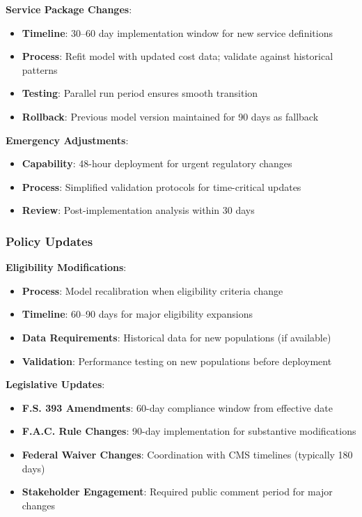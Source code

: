 \textbf{Service Package Changes}:
\begin{itemize}
    \item \textbf{Timeline}: 30--60 day implementation window for new service definitions
    \item \textbf{Process}: Refit model with updated cost data; validate against historical patterns
    \item \textbf{Testing}: Parallel run period ensures smooth transition
    \item \textbf{Rollback}: Previous model version maintained for 90 days as fallback
\end{itemize}

\textbf{Emergency Adjustments}:
\begin{itemize}
    \item \textbf{Capability}: 48-hour deployment for urgent regulatory changes
    \item \textbf{Process}: Simplified validation protocols for time-critical updates
    \item \textbf{Review}: Post-implementation analysis within 30 days
\end{itemize}

\subsubsection{Policy Updates}

\textbf{Eligibility Modifications}:
\begin{itemize}
    \item \textbf{Process}: Model recalibration when eligibility criteria change
    \item \textbf{Timeline}: 60--90 days for major eligibility expansions
    \item \textbf{Data Requirements}: Historical data for new populations (if available)
    \item \textbf{Validation}: Performance testing on new populations before deployment
\end{itemize}

\textbf{Legislative Updates}:
\begin{itemize}
    \item \textbf{F.S. 393 Amendments}: 60-day compliance window from effective date
    \item \textbf{F.A.C. Rule Changes}: 90-day implementation for substantive modifications
    \item \textbf{Federal Waiver Changes}: Coordination with CMS timelines (typically 180 days)
    \item \textbf{Stakeholder Engagement}: Required public comment period for major changes
\end{itemize}

